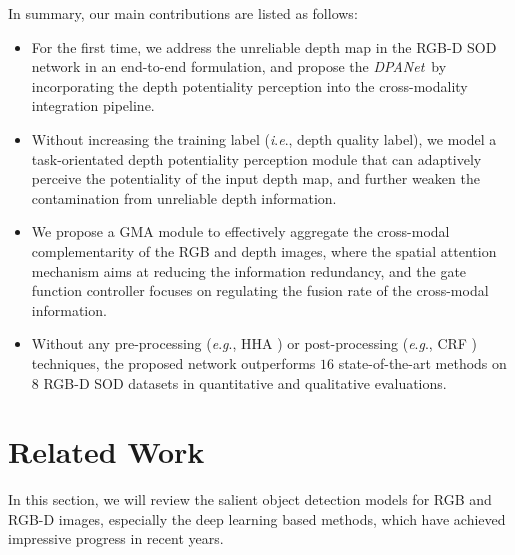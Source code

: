 \documentclass[journal]{IEEEtran}
\def\OURNET{\textit{DPANet}}
\newcommand{\ie}{\textit{i}.\textit{e}.}
\newcommand{\eg}{\textit{e}.\textit{g}.}
\begin{document}
\indent In summary, our main contributions are listed as follows:
\begin{itemize}[noitemsep, topsep=0pt]
	\item For the first time, we address the unreliable depth map in the RGB-D SOD network in an end-to-end formulation, and propose the \OURNET\ by incorporating the depth potentiality perception into the cross-modality integration pipeline.
	\item Without increasing the training label (\ie, depth quality label), we model a task-orientated depth potentiality perception module that can adaptively perceive the potentiality of the input depth map, and further weaken the contamination from unreliable depth information.
	\item We propose a GMA module to effectively aggregate the cross-modal complementarity of the RGB and depth images, where the spatial attention mechanism aims at reducing the information redundancy, and the gate function controller focuses on regulating the fusion rate of the cross-modal information.
	\item Without any pre-processing (\eg, HHA \cite{gupta2014learning}) or post-processing (\eg, CRF \cite{krahenbuhl2011efficient}) techniques, the proposed network outperforms $16$ state-of-the-art methods on $8$ RGB-D SOD datasets in quantitative and qualitative evaluations.
\end{itemize}
\section{Related Work}
In this section, we will review the salient object detection models for RGB and RGB-D images, especially the deep learning based methods, which have achieved impressive progress in recent years. \\
\end{document}
